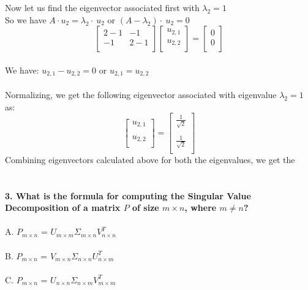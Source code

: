 \documentclass[prl,twocolumn,showpacs,preprintnumbers,superscriptaddress]{revtex4}
\theoremstyle{plain}
\theoremstyle{definition}
\begin{document}
\begin{widetext}
{\[\]
\\
\\
Now let us find the eigenvector associated first with $\lambda_{2} = 1$
\\
So we have $A \cdot u_{2} = \lambda_{2} \cdot \ u_{2}$ or $(A - \lambda_{2}) \cdot \ u_{2} = 0$
\\
\[
\begin{bmatrix}    2 - 1 & -1 \\     -1 & 2 - 1   \\ \end{bmatrix} \begin{bmatrix}    u_{2,1} \\     u_{2,2}  \\ \end{bmatrix}= \begin{bmatrix}    0 \\     0  \\ \end{bmatrix}
\]
\\
We have: $u_{2,1} - u_{2,2} = 0$ or $u_{2,1} =  u_{2,2}$
\\
\\
Normalizing, we get the following eigenvector associated with eigenvalue $\lambda_{2} = 1$ as:
\[
\begin{bmatrix}    u_{2,1} \\  \\   u_{2,2}  \\ \end{bmatrix}= \begin{bmatrix}    \frac{1}{\sqrt{2}} \\  \\   \frac{1}{\sqrt{2}}  \\ \end{bmatrix}
\]
Combining eigenvectors calculated above for both the eigenvalues, we get the 
\\
\\
\\
\textbf{3. What is the formula for computing the Singular Value Decomposition of a matrix $P$ of size $m \times n$, where $m \ne n$?}
\\
\\
A. $P_{m \times n}$ = $U_{m \times m}\Sigma_{m \times n} V^T_{n \times n}$
\\
\\
B. $P_{m \times n}$ = $V_{m \times n}\Sigma_{n \times n} U^T_{n \times m}$
\\
\\
C. $P_{m \times n}$ = $U_{n \times n}\Sigma_{n \times m} V^T_{m \times m}$
}
\end{widetext}
\end{document}
